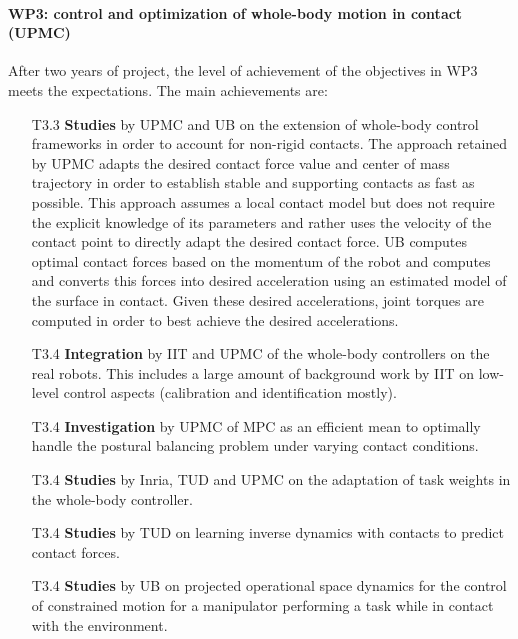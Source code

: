 

 
\paragraph*{WP3: control and optimization of whole-body motion in contact (UPMC)}

After two years of project, the level of achievement of the objectives in WP3 meets the expectations. The main achievements are:
\begin{itemize}
\item[T3.3] \textbf{Studies} by UPMC and UB on the extension of whole-body control frameworks in order to account for non-rigid contacts.  The approach retained by UPMC adapts the desired contact force value and center of mass trajectory in order to establish stable and supporting contacts as fast as possible. This approach assumes a local contact model but does not require the explicit knowledge of its parameters and rather uses the velocity of the contact point to directly adapt the desired contact force. UB computes optimal contact forces based on the momentum of the robot and computes and converts this forces into desired acceleration using an estimated model of the surface in contact. Given these desired accelerations, joint torques are computed in order to best achieve the desired accelerations.
\item[T3.4] \textbf{Integration} by IIT and UPMC of the whole-body controllers on the real robots. This includes a large amount of background work by IIT on low-level control aspects (calibration and identification mostly).
\item[T3.4] \textbf{Investigation} by UPMC of MPC as an efficient mean to optimally handle the postural balancing problem under varying contact conditions.
\item[T3.4] \textbf{Studies} by Inria, TUD and UPMC on the adaptation of task weights in the whole-body controller.
\item[T3.4] \textbf{Studies} by TUD on learning inverse dynamics with contacts to predict contact forces.
\item[T3.4] \textbf{Studies} by UB on projected operational space dynamics for the control of constrained motion for a manipulator performing a task while in contact with the environment.
\end{itemize}



